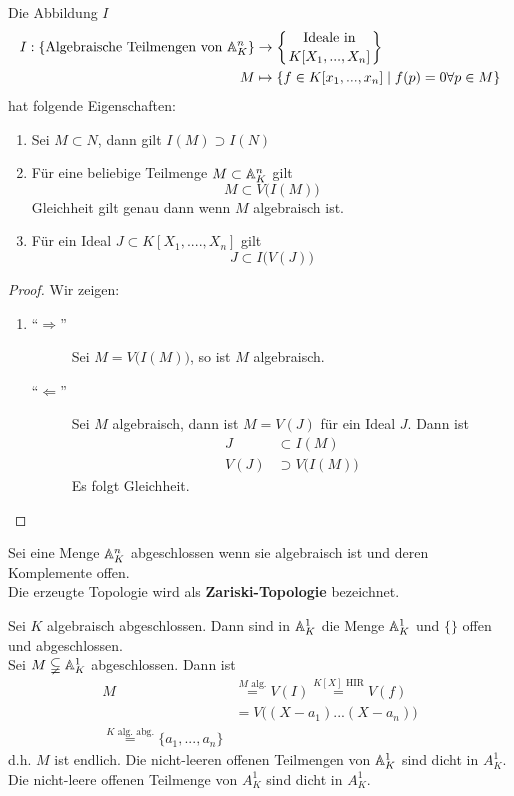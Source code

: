 	
	\begin{satz}
		Die Abbildung $I$ 
		\begin{align*}
		I:\left\{\text{Algebraische Teilmengen von $\mathbb{A}^n_K$}\right\}&\to\left\{\text{Ideale in}\atop{K[X_1,...,X_n]}\right\}\\
		M&\mapsto \{f\in K[x_1,...,x_n]\mid f(p)=0\forall p\in M\}
		\end{align*}
		hat folgende Eigenschaften:
		\begin{enumerate}
			\item Sei $M\subset N$, dann gilt $I(M)\supset I(N)$
			\item Für eine beliebige Teilmenge $M\subset \mathbb{A}_K^n$ gilt
			\[M\subset V\big(I(M)\big)\]
			Gleichheit gilt genau dann wenn $M$ algebraisch ist.
			\item Für ein Ideal $J\subset K[X_1,....,X_n]$ gilt
			\[J\subset I\big(V(J)\big)\]
		\end{enumerate}
	\end{satz}
	\begin{proof}
		Wir zeigen:
		\begin{enumerate}
			\item \begin{description}
				\item[\enquote{$\Rightarrow$}] Sei $M=V\big(I(M)\big)$, so ist $M$ algebraisch.
				\item[\enquote{$\Leftarrow$}] Sei $M$ algebraisch, dann ist $M=V(J)$ für ein Ideal $J$. Dann ist
				\begin{align}
				J&\subset I(M)\\
				V(J)&\supset V\big(I(M)\big)
				\end{align}
				Es folgt Gleichheit.
			\end{description}
		\end{enumerate}
	\end{proof}

	\begin{definition}
		Sei eine Menge $\mathbb{A}_K^n$ abgeschlossen wenn sie algebraisch ist und deren Komplemente offen.\\
		Die erzeugte Topologie wird als \textbf{Zariski-Topologie} bezeichnet.
	\end{definition}

	\begin{exm}
		Sei $K$ algebraisch abgeschlossen. Dann sind in $\mathbb{A}_K^1$ die Menge $\mathbb{A}_K^1$ und $\{\}$ offen und abgeschlossen.\\
		Sei $M\subsetneqq\mathbb{A}^1_K$ abgeschlossen. Dann ist
		\begin{align*}
		M&\overset{\text{$M$ alg.}}{=}V(I)\overset{\text{$K[X]$ HIR}}{=}V(f)\\
		&=V\big((X-a_1)...(X-a_n)\big)\\
		\overset{\text{$K$ alg. abg.}}{=}\{a_1,...,a_n\}
		\end{align*}
		d.h. $M$ ist endlich. Die nicht-leeren offenen Teilmengen von $\mathbb{A}_K^1$ sind dicht in $A_K^1$.\\
		Die nicht-leere offenen Teilmenge von $A_K^1$ sind dicht in $A_K^1$.
	\end{exm}
	
